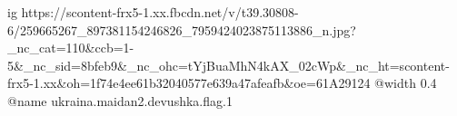  
 
 
 
 

\ifcmt
  ig https://scontent-frx5-1.xx.fbcdn.net/v/t39.30808-6/259665267_897381154246826_7959424023875113886_n.jpg?_nc_cat=110&ccb=1-5&_nc_sid=8bfeb9&_nc_ohc=tYjBuaMhN4kAX_02cWp&_nc_ht=scontent-frx5-1.xx&oh=1f74e4ee61b32040577e639a47afeafb&oe=61A29124
  @width 0.4
	@name ukraina.maidan2.devushka.flag.1
\fi
